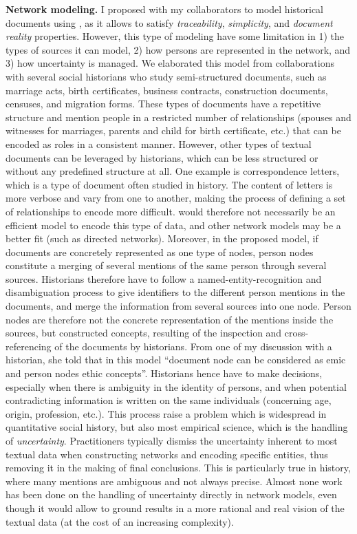 \noindent\textbf{Network modeling.} I proposed with my collaborators to model historical documents using \modelplural, as it allows to satisfy \emph{traceability}, \emph{simplicity}, and \emph{document reality} properties. However, this type of modeling have some limitation in 1) the types of sources it can model, 2) how persons are represented in the network, and 3) how uncertainty is managed.
We elaborated this model from collaborations with several social historians who study semi-structured documents, such as marriage acts, birth certificates, business contracts, construction documents, censuses, and migration forms.
These types of documents have a repetitive structure and mention people in a restricted number of relationships (spouses and witnesses for marriages, parents and child for birth certificate, etc.) that can be encoded as roles in a consistent manner.
However, other types of textual documents can be leveraged by historians, which can be less structured or without any predefined structure at all.
One example is correspondence letters, which is a type of document often studied in history\cite{rollingerCicerosSupplicatioUnd2017, edelsteinHistoricalResearchDigital2017}.
The content of letters is more verbose and vary from one to another, making the process of defining a set of relationships to encode more difficult.
\modelplural would therefore not necessarily be an efficient model to encode this type of data, and other network models may be a better fit (such as directed networks).
Moreover, in the proposed model, if documents are concretely represented as one type of nodes, person nodes constitute a merging of several mentions of the same person through several sources.
Historians therefore have to follow a named-entity-recognition and disambiguation process to give identifiers to the different person mentions in the documents, and merge the information from several sources into one node.
Person nodes are therefore not the concrete representation of the mentions inside the sources, but constructed concepts, resulting of the inspection and cross-referencing of the documents by historians.
From one of my discussion with a historian, she told that in this model ``document node can be considered as emic and person nodes ethic concepts''\cite{headlandEmicsEticsInsider1990}.
Historians hence have to make decisions, especially when there is ambiguity in the identity of persons, and when potential contradicting information is written on the same individuals (concerning age, origin, profession, etc.).
This process raise a problem which is widespread in quantitative social history, but also most empirical science, which is the handling of \emph{uncertainty}.
Practitioners typically dismiss the uncertainty inherent to most textual data when constructing networks and encoding specific entities, thus removing it in the making of final conclusions.
This is particularly true in history, where many mentions are ambiguous and not always precise\cite{dufournaudRechercheEmpiriqueHistoire2015}.
Almost none work has been done on the handling of uncertainty directly in network models\cite{adarManagingUncertaintySocial, schulzProbabilisticGraphLayout2017}, even though it would allow to ground results in a more rational and real vision of the textual data (at the cost of an increasing complexity).

